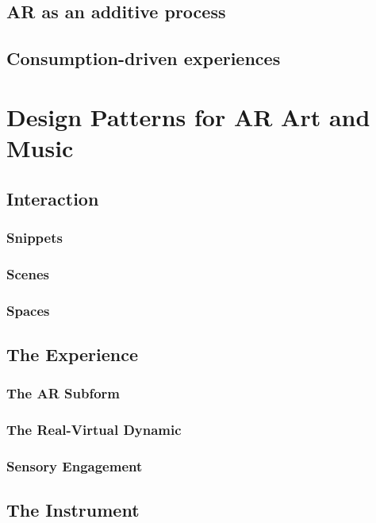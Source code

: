 \subsection{AR as an additive process}\label{sec: method-resistance-additive}

\subsection{Consumption-driven experiences}\label{sec: method-resistance-consumer}


\section{Design Patterns for AR Art and Music} \label{sec: method-patterns}
\subsection{Interaction}
\subsubsection{Snippets}
\subsubsection{Scenes}
\subsubsection{Spaces}

\subsection{The Experience}
\subsubsection{The AR Subform}
\subsubsection{The Real-Virtual Dynamic}
\subsubsection{Sensory Engagement}

\subsection{The Instrument}
